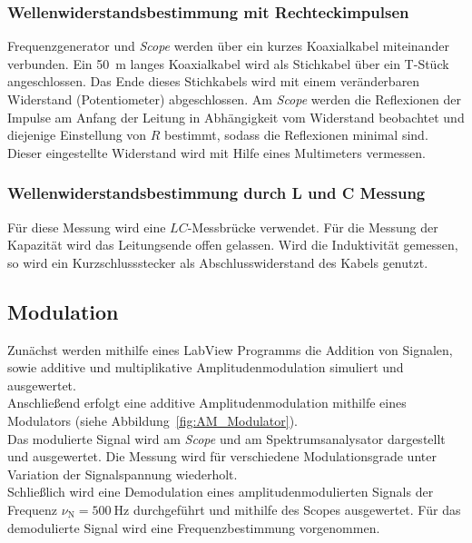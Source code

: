 \documentclass[a4paper,twoside,final]{article}
\begin{document}
\subsubsection{Wellenwiderstandsbestimmung mit Rechteckimpulsen}\label{subsec:BestimmungZL}
Frequenzgenerator und \textit{Scope} werden über ein kurzes Koaxialkabel miteinander verbunden. Ein \SI{50}{\metre} langes Koaxialkabel wird als Stichkabel über ein T-Stück angeschlossen. Das Ende dieses Stichkabels wird mit einem veränderbaren Widerstand (Potentiometer) abgeschlossen. Am \textit{Scope} werden die Reflexionen der Impulse am Anfang der Leitung in Abhängigkeit vom Widerstand beobachtet und diejenige Einstellung von $R$ bestimmt, sodass die Reflexionen minimal sind. Dieser eingestellte Widerstand wird mit Hilfe eines Multimeters vermessen.

\subsubsection{Wellenwiderstandsbestimmung durch L und C Messung}
Für diese Messung wird eine $LC$-Messbrücke verwendet. Für die Messung der Kapazität wird das Leitungsende offen gelassen. Wird die Induktivität gemessen, so wird ein Kurzschlussstecker als Abschlusswiderstand des Kabels genutzt.

\subsection{Modulation}
Zunächst werden mithilfe eines LabView Programms die Addition von Signalen, sowie additive und multiplikative Amplitudenmodulation simuliert und ausgewertet.\\
Anschließend erfolgt eine additive Amplitudenmodulation mithilfe eines Modulators (siehe Abbildung~\ref{fig:AM_Modulator}).\\
Das modulierte Signal wird am \textit{Scope} und am Spektrumsanalysator dargestellt und ausgewertet. Die Messung wird für verschiedene Modulationsgrade unter Variation der Signalspannung wiederholt.\\
Schließlich wird eine Demodulation eines amplitudenmodulierten Signals der Frequenz $\nu_\text{N} = \SI{500}{\hertz}$ durchgeführt und mithilfe des Scopes ausgewertet. Für das demodulierte Signal wird eine Frequenzbestimmung vorgenommen.
\end{document}
